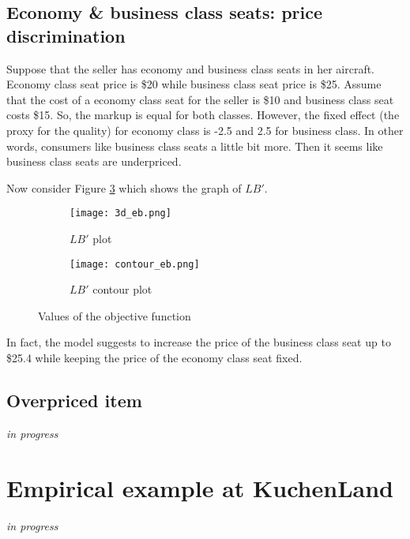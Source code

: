 \documentclass[12pt]{article}
\begin{document}
\subsection{Economy \& business class seats: price discrimination}
Suppose that the seller has economy and business class seats in her aircraft.
Economy class seat price is \$20 while business class seat price is \$25.
Assume that the cost of a economy class seat for the seller is \$10 and business class seat costs \$15. So, the markup is equal for both classes.
However, the fixed effect (the proxy for the quality) for economy class is -2.5 and 2.5 for business class.
In other words, consumers like business class seats a little bit more.
Then it seems like business class seats are underpriced.

Now consider Figure \ref{fig:figg1} which shows the graph of $LB'$.


\begin{figure}[H]
\centering
\begin{subfigure}{0.49\textwidth}
\centering
\texttt{[image: 3d\_eb.png]}
\caption{$LB'$ plot}
\label{fig:left}
\end{subfigure}
\begin{subfigure}{0.49\textwidth}
\centering
\texttt{[image: contour\_eb.png]}
\caption{$LB'$ contour plot}
\label{fig:right}
\end{subfigure}
\caption{Values of the objective function}
\label{fig:figg1}
\end{figure}

In fact, the model suggests to increase the price of the business class seat up to \$25.4 while keeping the price of the economy class seat fixed.

\subsection{Overpriced item}
\textit{in progress}

\newpage
\section{Empirical example at KuchenLand}
\textit{in progress}
\end{document}
